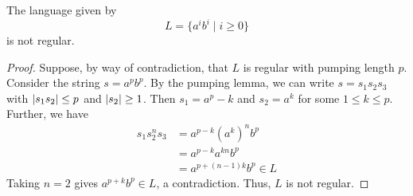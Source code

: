 \begin{theorem}
      The language given by \[ L=\{a^i b^i \mid i\geq0\} \] is not regular.
\end{theorem}

\begin{proof}
      Suppose, by way of contradiction, that \(L\) is regular with pumping length \(p\). Consider the string \(s=a^p b^p\). By the pumping lemma, we can write \(s=s_1s_2s_3\) with \(\abs{s_1s_2}\leq p\) and \(\abs{s_2}\geq 1\). Then \(s_1=a^p-k\) and \(s_2=a^k\) for some \(1\leq k\leq p\). Further, we have 
      \begin{align*}
            s_1s_2^n s_3 &= a^{p-k}{(a^k)}^n b^p\\
                         &= a^{p-k}a^{kn}b^p\\
                         &= a^{p+(n-1)k}b^p \in L
      \end{align*}
      Taking \(n=2\) gives \(a^{p+k}b^p\in L\), a contradiction. Thus, \(L\) is not regular.
\end{proof}